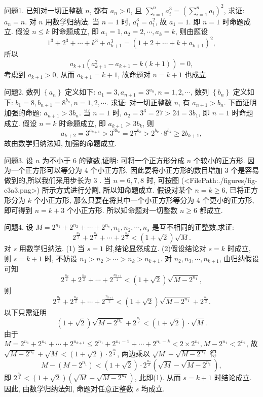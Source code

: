 
问题1. 已知对一切正整数 $n$, 都有 $a_n>0$, 且 $\sum_{i=1}^n a_i^3=\left(\sum_{i=1}^n a_i\right)^2$, 求证: $a_n=n$. 
对 $n$ 用数学归纳法.
当 $n=1$ 时, $a_1^3=a_1^2$, 故 $a_1=1$. 即 $n=1$ 时命题成立.
假设 $n \leqslant k$ 时命题成立, 即 $a_1=1, a_2=2, \cdots, a_k=k$, 则由题设
$$
1^3+2^3+\cdots+k^3+a_{k+1}^3=\left(1+2+\cdots+k+a_{k+1}\right)^2,
$$
所以
$$
a_{k+1}\left(a_{k+1}^2-a_{k+1}-k(k+1)\right)=0,
$$
考虑到 $a_{k+1}>0$, 从而 $a_{k+1}=k+1$, 故命题对 $n=k+1$ 也成立.



问题2. 数列 $\left\{a_n\right\}$ 定义如下: $a_1=3, a_{n+1}=3^{a_n}, n=1,2, \cdots$, 数列 $\left\{b_n\right\}$ 定义如下: $b_1=8, b_{n+1}=8^{b_n}, n=1,2, \cdots$. 求证: 对一切正整数 $n$, 有 $a_{n+1}>b_n$.
下面证明加强的命题: $a_{n+1}>3 b_n$.
当 $n=1$ 时, $a_2=3^3=27>24=3 b_1$, 即 $n=1$ 时命题成立.
假设 $n=k$ 时命题成立, 即 $a_{k+1}>3 b_k$, 则
$$
a_{k+2}=3^{a_{k+1}}>3^{3 b_k}=27^{b_k}>2^{b_k} \cdot 8^{b_k} \geqslant 2 b_{k+1},
$$
故由数学归纳法知, 加强的命题成立.



问题3. 设 $n$ 为不小于 6 的整数,证明: 可将一个正方形分成 $n$ 个较小的正方形.
因为一个正方形可以等分为 4 个小正方形, 因此要将小正方形的数目增加 3 个是容易做到的,所以我们采用步长为 3 .
当 $n=6,7,8$ 时, 可按图 (<FilePath:./figures/fig-c3a3.png>) 所示方式进行分割, 所以知命题成立.
假设对某个 $n=k \geqslant 6$, 已将正方形分为 $k$ 个小正方形, 那么只要在将其中一个小正方形等分为 4 个更小的正方形, 即可得到 $n=k+3$ 个小正方形.
所以知命题对一切整数 $n \geqslant 6$ 都成立.



问题4. 设 $M=2^{n_1}+2^{n_2}+\cdots+2^{n_s}, n_1, n_2, \cdots, n_s$ 是互不相同的正整数,求证:
$$
2^{\frac{n_1}{2}}+2^{\frac{n_2}{2}}+\cdots+2^{\frac{n_s}{2}}<(1+\sqrt{2}) \sqrt{M} .
$$
对 $s$ 用数学归纳法.
(1) 当 $s=1$ 时,结论显然成立.
(2)假设结论对 $s=k$ 时成立, 则 $s=k+1$ 时, 不妨设 $n_1>n_2>\cdots> n_k>n_{k+1}$. 对 $n_2, n_3, \cdots, n_{k+1}$, 由归纳假设可知
$$
2^{\frac{n_2}{2}}+2^{\frac{n_3}{2}}+\cdots+2^{\frac{n_{k+1}}{2}}<(1+\sqrt{2}) \sqrt{M-2^{n_1}},
$$
则
$$
2^{\frac{n_1}{2}}+2^{\frac{n_2}{2}}+\cdots+2^{\frac{n_{k+1}}{2}}<(1+\sqrt{2}) \sqrt{M-2^{n_1}}+2^{\frac{n_1}{2}} .
$$
以下只需证明
$$
(1+\sqrt{2}) \sqrt{M-2^{n_1}}+2^{\frac{n_1}{2}}<(1+\sqrt{2}) \cdot \sqrt{M} .
$$
由于 $M=2^{n_1}+2^{n_2}+\cdots+2^{n_{k+1}} \leqslant 2^{n_1}+2^{n_1-1}+\cdots+2^{n_1-k}<2 \times 2^{n_1}, M- 2^{n_1}<2^{n_1}$, 故 $\sqrt{M-2^{n_1}}+\sqrt{M}<(1+\sqrt{2}) \cdot 2^{\frac{n_1}{2}}$, 两边乘以 $\sqrt{M}-\sqrt{M-2^{n_1}}$ 得
$$
M-\left(M-2^{n_1}\right)<(1+\sqrt{2}) \cdot 2^{\frac{n_1}{2}}\left(\sqrt{M}-\sqrt{M-2^{n_1}}\right),
$$
即 $2^{\frac{n_1}{2}}<(1+\sqrt{2})\left(\sqrt{M}-\sqrt{M-2^{n_1}}\right)$, 此即(1). 从而 $s=k+1$ 时结论成立.
因此, 由数学归纳法知, 命题对任意正整数 $s$ 均成立.



